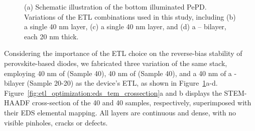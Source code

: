 \begin{figure}[htbp]
    \caption{(a) Schematic illustration of the bottom illuminated PePD. Variations of the ETL combinations used in this study, including (b) a single 40 nm  layer, (c) a single 40 nm  layer, and (d) a  –  bilayer, each 20 nm thick.}
    \label{fig:etl_optimization:stacks}
\end{figure}

Considering the importance of the ETL choice on the reverse-bias stability of perovskite-based diodes, we fabricated three variation of the same stack, employing 40 nm of  (Sample 40), 40 nm of  (Sample 40), and a 40 nm of a - bilayer (Sample 20-20) as the device's ETL, as shown in Figure~\ref{fig:etl_optimization:stacks}a-d. Figure~\ref{fig:etl_optimization:eds_tem_crossection}a and b displays the STEM-HAADF cross-section of the 40 and 40 samples, respectively, superimposed with their EDS elemental mapping. All layers are continuous and dense, with no visible pinholes, cracks or defects. 


